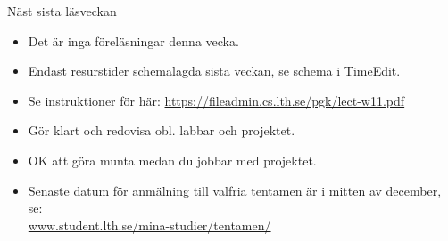

\ifkompendium\else


\begin{Slide}{Näst sista läsveckan}

  \begin{itemize}
    \item Det är inga föreläsningar denna vecka.
    \item Endast resurstider schemalagda sista veckan, se schema i TimeEdit.
    \item Se instruktioner för  här: \url{https://fileadmin.cs.lth.se/pgk/lect-w11.pdf}
    \item Gör klart och redovisa  obl. labbar och projektet.
    \item OK att göra munta medan du jobbar med projektet.
    \item Senaste datum för anmälning till valfria tentamen är i mitten av december, se: \\\href{https://www.student.lth.se/mina-studier/tentamen/}{www.student.lth.se/mina-studier/tentamen/}
  \end{itemize}

\end{Slide}



\fi




